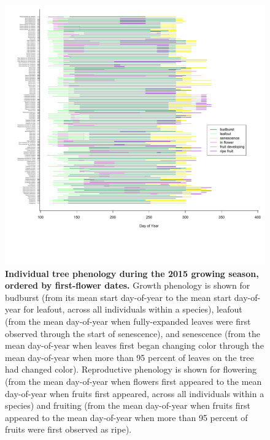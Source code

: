 \documentclass{article}
\begin{document}
\begin{figure}[h]
  \centering
  \includegraphics{analyses/figures/grosea_repsort_ripefruit_ind_legend.pdf}
  \caption{\textbf{Individual tree phenology during the 2015 growing season, ordered by first-flower dates.} Growth phenology is shown for budburst (from its mean start day-of-year to the mean start day-of-year for leafout, across all individuals within a species), leafout (from the mean day-of-year when fully-expanded leaves were first observed through the start of senescence), and senescence (from the mean day-of-year when leaves first began changing color through the mean day-of-year when more than 95 percent of leaves on the tree had changed color). Reproductive phenology is shown for flowering (from the mean day-of-year when flowers first appeared to the mean day-of-year when fruits first appeared, across all individuals within a species) and fruiting (from the mean day-of-year when fruits first appeared to the mean day-of-year when more than 95 percent of fruits were first observed as ripe).}
 \label{fig:focind}
\end{figure}
  
\end{document}
